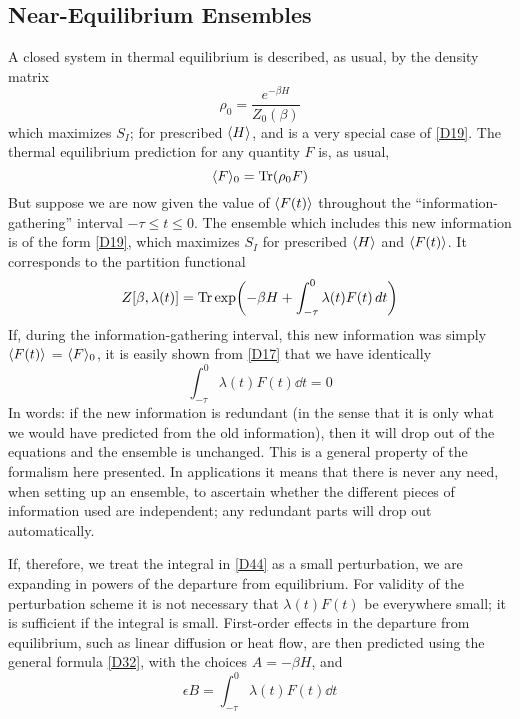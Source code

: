 \subsection{Near-Equilibrium Ensembles}
A closed system in thermal equilibrium is described, as usual, by the density matrix
\begin{equation}
	\rho_0 = \frac{e^{-\beta H}}{Z_0(\beta)}
\end{equation}
which maximizes $S_I$; for prescribed $\langle H\rangle$, and is a very special case of \eqref{D19}.
The thermal equilibrium prediction for any quantity $F$ is, as usual,
\begin{equation}
	\langle F\rangle_0 = \operatorname{Tr}(\rho_0 F)
\end{equation}
But suppose we are now given the value of $\langle F(t)\rangle$ throughout the ``infor\-mation-gathering'' interval $-\tau \leq t \leq 0$.
The ensemble which includes this new information is of the form \eqref{D19}, which maximizes $S_I$ for prescribed $\langle H\rangle$ and $\langle F(t)\rangle$.
It corresponds to the partition functional
\begin{equation}
	\label{D44}
	Z[\beta, \lambda(t)] = \Tr \exp \left(-\beta H + \int_{-\tau}^{0} \lambda(t) F(t) \dd t \right)
\end{equation}
If, during the information-gathering interval, this new information was simply $\langle F(t)\rangle$ = $\langle F\rangle_0$, it is easily shown from \eqref{D17} that we have identically
\begin{equation}
	\int_{-\tau}^{0} \lambda(t) F(t) \dd t = 0
\end{equation}
In words: if the new information is redundant (in the sense that it is only what we would have predicted from the old information), then it will drop out of the equations and the ensemble is unchanged.
This is a general property of the formalism here presented.
In applications it means that there is never any need, when setting up an ensemble, to ascertain whether the different pieces of information used are independent; any redundant parts will drop out automatically.

If, therefore, we treat the integral in \eqref{D44} as a small perturbation, we are expanding in powers of the departure from equilibrium.
For validity of the perturbation scheme it is not necessary that $\lambda(t) F(t)$ be everywhere small; it is sufficient if the integral is small.
First-order effects in the departure from equilibrium, such as linear diffusion or heat flow, are then predicted using the general formula \eqref{D32}, with the choices $A = -\beta H$, and
\begin{equation}
	\epsilon B = \int_{-\tau}^{0} \lambda(t) F(t) \dd t
\end{equation}

